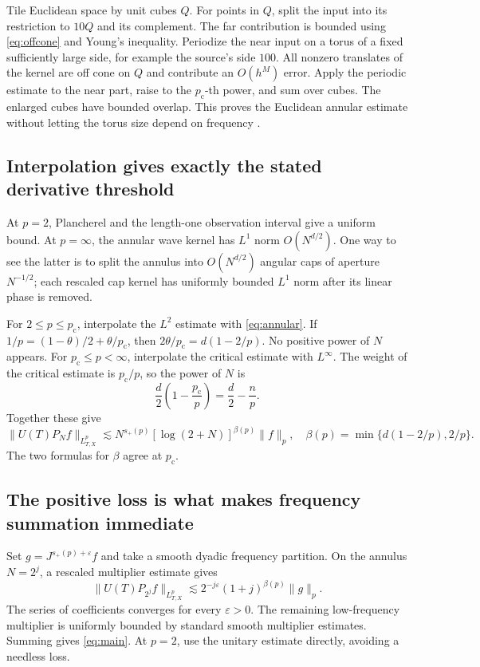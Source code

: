 \documentclass[11pt,a4paper]{article}
\numberwithin{equation}{section}
\theoremstyle{definition}
\theoremstyle{remark}
\newcommand{\eps}{\varepsilon}
\newcommand{\pc}{p_{\mathrm c}}
\begin{document}
Tile Euclidean space by unit cubes $Q$. For points in $Q$, split the input
into its restriction to $10Q$ and its complement. The far contribution is
bounded using \eqref{eq:offcone} and Young's inequality. Periodize the near
input on a torus of a fixed sufficiently large side, for example the source's
side $100$. All nonzero translates of the kernel are off cone on $Q$ and
contribute an $O(h^M)$ error. Apply the periodic estimate to the near part,
raise to the $\pc$-th power, and sum over cubes. The enlarged cubes have
bounded overlap. This proves the Euclidean annular estimate without letting
the torus size depend on frequency \cite{transfer}.

\subsection{Interpolation gives exactly the stated derivative threshold}
At $p=2$, Plancherel and the length-one observation interval give a uniform
bound. At $p=\infty$, the annular wave kernel has $L^1$ norm $O(N^{d/2})$.
One way to see the latter is to split the annulus into $O(N^{d/2})$ angular
caps of aperture $N^{-1/2}$; each rescaled cap kernel has uniformly bounded
$L^1$ norm after its linear phase is removed.

For $2\le p\le\pc$, interpolate the $L^2$ estimate with
\eqref{eq:annular}. If $1/p=(1-\theta)/2+\theta/\pc$, then
$2\theta/\pc=d(1-2/p)$. No positive power of $N$ appears.
For $\pc\le p<\infty$, interpolate the critical estimate with $L^\infty$.
The weight of the critical estimate is $\pc/p$, so the power of $N$ is
\[
 \frac d2\left(1-\frac{\pc}{p}\right)=\frac d2-\frac np.
\]
Together these give
\begin{equation}\label{eq:allp}
 \|U(T)P_Nf\|_{L^p_{T,X}}
 \lesssim N^{s_+(p)}[\log(2+N)]^{\beta(p)}\|f\|_p,
 \quad
 \beta(p)=\min\{d(1-2/p),2/p\}.
\end{equation}
The two formulas for $\beta$ agree at $\pc$.

\subsection{The positive loss is what makes frequency summation immediate}
Set $g=J^{s_+(p)+\eps}f$ and take a smooth dyadic frequency partition.
On the annulus $N=2^j$, a rescaled multiplier estimate gives
\[
 \|U(T)P_{2^j}f\|_{L^p_{T,X}}
 \lesssim 2^{-j\eps}(1+j)^{\beta(p)}\|g\|_p.
\]
The series of coefficients converges for every $\eps>0$. The remaining
low-frequency multiplier is uniformly bounded by standard smooth multiplier
estimates. Summing gives \eqref{eq:main}. At $p=2$, use the unitary estimate
directly, avoiding a needless loss.
\end{document}
